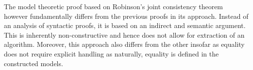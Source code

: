 

The model theoretic proof based on Robinson's joint consistency theorem however fundamentally differs from the previous proofs in its approach.
Instead of an analysis of syntactic proofs, it is based on an indirect and semantic argument.
This is inherently non-constructive and hence does not allow for extraction of an algorithm.
Moreover, this approach also differs from the other insofar as equality does not require explicit handling
as naturally, equality is defined in the constructed models.







%
%
%
%
%
